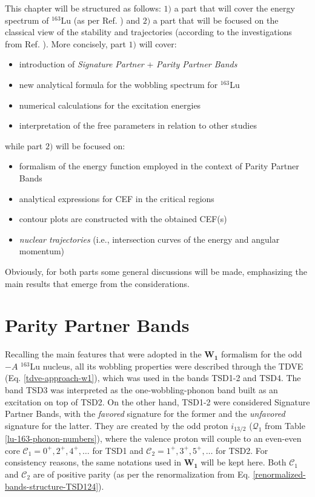 This chapter will be structured as follows: $1)$ a part that will cover the energy spectrum of $^{163}$Lu (as per Ref. \cite{poenaru2021extensive1}) and $2)$ a part that will be focused on the classical view of the stability and trajectories (according to the investigations from Ref. \cite{poenaru2021extensive2}). More concisely, part $1)$ will cover:
\begin{itemize}
    \item introduction of \emph{Signature Partner} + \emph{Parity Partner Bands}
    \item new analytical formula for the wobbling spectrum for $^{163}$Lu
    \item numerical calculations for the excitation energies
    \item interpretation of the free parameters in relation to other studies
\end{itemize}
while part $2)$ will be focused on:
\begin{itemize}
    \item formalism of the energy function employed in the context of Parity Partner Bands
    \item analytical expressions for CEF in the critical regions
    \item contour plots are constructed with the obtained CEF(s)
    \item \emph{nuclear trajectories} (i.e., intersection curves of the energy and angular momentum) 
\end{itemize}

Obviously, for both parts some general discussions will be made, emphasizing the main results that emerge from the considerations.

\section{Parity Partner Bands}
\label{parity-partners-renormalizaion}

Recalling the main features that were adopted in the $\mathbf{W_1}$ formalism for the odd$-A$ $^{163}$Lu nucleus, all its wobbling properties were described through the TDVE (Eq. \ref{tdve-approach-w1}), which was used in the bands TSD1-2 and TSD4. The band TSD3 was interpreted as the one-wobbling-phonon band built as an excitation on top of TSD2. On the other hand, TSD1-2 were considered Signature Partner Bands, with the \emph{favored} signature for the former and the \emph{unfavored} signature for the latter. They are created by the odd proton $i_{13/2}$ ($\mathcal{Q}_1$ from Table \ref{lu-163-phonon-numbers}), where the valence proton will couple to an even-even core $\mathscr{C}_1=0^+,2^+,4^+,\dots$ for TSD1 and $\mathscr{C}_2=1^+,3^+,5^+,\dots$ for TSD2. For consistency reasons, the same notations used in $\mathbf{W_1}$ will be kept here. Both $\mathscr{C}_1$ and $\mathscr{C}_2$ are of positive parity (as per the renormalization from Eq. \ref{renormalized-bands-structure-TSD124}).

